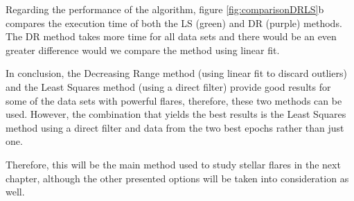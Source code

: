 Regarding the performance of the algorithm, figure \ref{fig:comparisonDRLS}b compares the execution time of both the LS (green) and DR (purple) methods. The DR method takes more time for all data sets and there would be an even greater difference would we compare the method using linear fit.

In conclusion, the Decreasing Range method (using linear fit to discard outliers) and the Least Squares method (using a direct filter) provide good results for some of the data sets with powerful flares, therefore, these two methods can be used. However, the combination that yields the best results is the Least Squares method using a direct filter and data from the two best epochs rather than just one.

Therefore, this will be the main method used to study stellar flares in the next chapter, although the other presented options will be taken into consideration as well.

